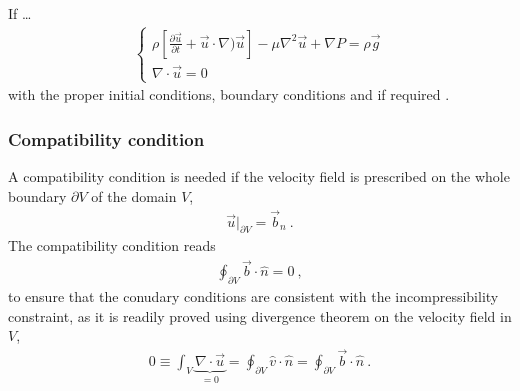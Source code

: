 \documentclass[letterpaper,10pt,english]{jupyterBook}
\begin{document}
\sphinxAtStartPar
If …
\begin{equation}\label{equation:ch/fluids/incompressible:eq:ns-eqn}
\begin{split}\begin{cases}
\rho \left[ \frac{\partial \vec{u}}{\partial t} + \vec{u} \cdot \nabla ) \vec{u} \right] - \mu \nabla^2 \vec{u} + \nabla P = \rho \vec{g} \\
\nabla \cdot \vec{u} = 0
\end{cases}\end{split}
\end{equation}
\sphinxAtStartPar
with the proper initial conditions, boundary conditions and \sphinxhyphen{} if required \sphinxhyphen{} {\hyperref[\detokenize{ch/fluids/incompressible:fluid-mechanics-incompressible-compatibility}]{}}.

\label{\detokenize{ch/fluids/incompressible:fluid-mechanics-incompressible-compatibility}}\subsubsection*{Compatibility condition}

\sphinxAtStartPar
A compatibility condition is needed if the velocity field is prescribed on the whole boundary \(\partial V\) of the domain \(V\),
\begin{equation*}
\begin{split}\vec{u}\bigg|_{\partial V} = \vec{b}_n \ .\end{split}
\end{equation*}
\sphinxAtStartPar
The compatibility condition reads
\begin{equation*}
\begin{split}\oint_{\partial V} \vec{b}  \cdot \hat{n} = 0 \ ,\end{split}
\end{equation*}
\sphinxAtStartPar
to ensure that the conudary conditions are consistent with the incompressibility constraint, as it is readily proved using divergence theorem on the velocity field in \(V\),
\begin{equation*}
\begin{split}0 \equiv \int_V \underbrace{\nabla \cdot \vec{u}}_{= 0} = \oint_{\partial V} \hat{v} \cdot \hat{n} = \oint_{\partial V} \vec{b} \cdot \hat{n} \ .\end{split}
\end{equation*}
\end{document}
